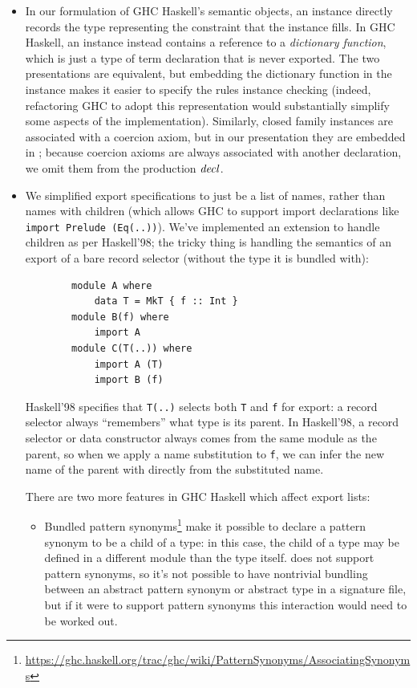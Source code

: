 \begin{itemize}
    \item In our formulation of GHC Haskell's semantic objects, an
    instance directly records the type representing the constraint that
    the instance fills.  In GHC Haskell, an instance instead contains a
    reference to a \emph{dictionary function}, which is just a type of
    term declaration that is never exported.  The two presentations are
    equivalent, but embedding the dictionary function in the instance
    makes it easier to specify the rules instance checking (indeed,
    refactoring GHC to adopt this representation would substantially
    simplify some aspects of the implementation).  Similarly,
    closed family instances are associated with a coercion axiom, but in
    our presentation they are embedded in ; because coercion axioms
    are always associated with another declaration, we omit them from the
    production $\mathit{decl}$.

    \item We simplified export specifications to just be a list of
    names, rather than names with children (which allows GHC to support
    import declarations like \verb|import Prelude (Eq(..))|).  We've
    implemented an extension to handle children as per Haskell'98; the
    tricky thing is handling the semantics of an export of a bare
    record selector (without the type it is bundled with):

    \begin{lstlisting}
        module A where
            data T = MkT { f :: Int }
        module B(f) where
            import A
        module C(T(..)) where
            import A (T)
            import B (f)
    \end{lstlisting}

    Haskell'98 specifies that \verb|T(..)| selects both \verb|T| and \verb|f|
    for export: a record selector always ``remembers'' what type is its
    parent.  In Haskell'98, a record selector or data constructor
    always comes from the same module as the parent, so when
    we apply a name substitution to \verb|f|, we can infer the new name of
    the parent with directly from the substituted name.

    There are two more features in GHC Haskell which affect export lists:
    \begin{itemize}

        \item Bundled pattern synonyms\footnote{\url{https://ghc.haskell.org/trac/ghc/wiki/PatternSynonyms/AssociatingSynonyms}} make it possible to declare a pattern synonym
            to be a child of a type: in this case, the child of a type may
            be defined in a different module than the type itself.
            \Backpack{} does not support pattern synonyms, so it's
            not possible to have nontrivial bundling between an abstract
            pattern synonym or abstract type in a signature file, but if it
            were to support pattern synonyms this interaction would need to
            be worked out.


\end{itemize}
\end{itemize}
